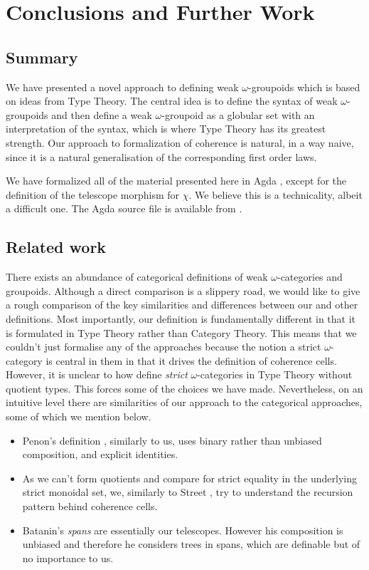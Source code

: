 \section{Conclusions and Further Work}
\label{sec:conclusions}

\subsection{Summary}
We have presented a novel approach to defining weak $\omega$-groupoids
which is based on ideas from Type Theory. The central idea is to
define the syntax of weak $\omega$-groupoids and then define a weak
$\omega$-groupoid as a globular set with an interpretation of the
syntax, which is where Type Theory has its greatest strength. Our
approach to formalization of coherence is natural, in a way naive,
since it is a natural generalisation of the corresponding first order
laws.

We have formalized all of the material presented here in Agda
\cite{agda}, except for the definition of the telescope morphism for
$\chi$.
We believe this is
a technicality, albeit a difficult one. The Agda source file is available
from \cite{coreagda}.


\subsection{Related work}
There exists an abundance of categorical definitions of weak
$\omega$-categories and groupoids.  Although a direct comparison is a
slippery road, we would like to give a rough comparison of the key
similarities and differences between our and other definitions. Most
importantly, our definition is fundamentally different in that it is
formulated in Type Theory rather than Category Theory. This means that
we couldn't just formalise any of the approaches
\cite{penon:1999,batanin98:monoidal-globular,leinster:2000} because
the notion a strict $\omega$-category is central in them in that it
drives the definition of coherence cells. However, it is unclear to how define
\emph{strict} $\omega$-categories in Type Theory
without quotient types. This forces some of the choices we have
made. Nevertheless, on an intuitive level there are similarities of our approach to the
categorical approaches, some of which we mention below.
\begin{itemize}
\item Penon's definition \cite{penon:1999}, similarly to us, uses
  binary rather than unbiased composition, and explicit
  identities. 
\item As we can't form quotients and compare for strict equality in
  the underlying strict monoidal set, we, similarly to Street
  \cite{street87:simplexes}, try to understand the recursion pattern
  behind coherence cells.
\item Batanin's \emph{spans} are essentially our telescopes. However
  his composition is unbiased and therefore he considers trees in
  spans, which are definable but of no importance to us.
\end{itemize}
%



